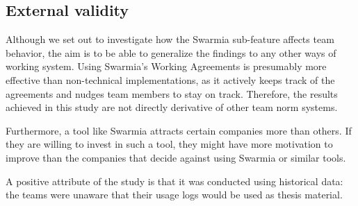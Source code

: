 \subsection{External validity}

Although we set out to investigate how the Swarmia sub-feature affects team behavior, the aim is to be able to generalize the findings to any other ways of working system. Using Swarmia's Working Agreements is presumably more effective than non-technical implementations, as it actively keeps track of the agreements and nudges team members to stay on track. Therefore, the results achieved in this study are not directly derivative of other team norm systems. 

Furthermore, a tool like Swarmia attracts certain companies more than others. If they are willing to invest in such a tool, they might have more motivation to improve than the companies that decide against using Swarmia or similar tools. 

A positive attribute of the study is that it was conducted using historical data: the teams were unaware that their usage logs would be used as thesis material. 